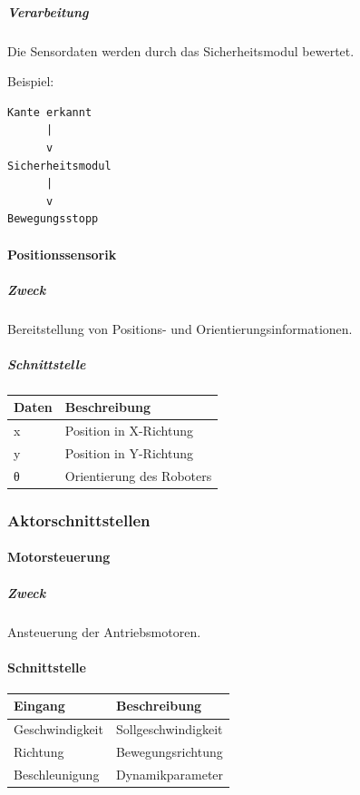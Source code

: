 \documentclass[
  a4paper,
  12pt,
  DIV=12,        %
  parskip=half,  %
  headings=small %
]{scrartcl}
\theoremstyle{definition}
\theoremstyle{definition}
\begin{document}
\subparagraph{Verarbeitung}\label{verarbeitung}

Die Sensordaten werden durch das Sicherheitsmodul bewertet.

Beispiel:

\begin{verbatim}
Kante erkannt
      |
      v
Sicherheitsmodul
      |
      v
Bewegungsstopp
\end{verbatim}

\paragraph{Positionssensorik}\label{positionssensorik-2}

\subparagraph{Zweck}\label{zweck-2}

Bereitstellung von Positions- und Orientierungsinformationen.

\subparagraph{Schnittstelle}\label{schnittstelle-2}

\begin{longtable}[]{@{}ll@{}}
\toprule\noalign{}
Daten & Beschreibung \\
\midrule\noalign{}
\endhead
\bottomrule\noalign{}
\endlastfoot
x & Position in X-Richtung \\
y & Position in Y-Richtung \\
θ & Orientierung des Roboters \\
\end{longtable}

\subsubsection{Aktorschnittstellen}\label{aktorschnittstellen}

\paragraph{Motorsteuerung}\label{motorsteuerung}

\subparagraph{Zweck}\label{zweck-3}

Ansteuerung der Antriebsmotoren.

\paragraph{Schnittstelle}\label{schnittstelle-3}

\begin{longtable}[]{@{}ll@{}}
\toprule\noalign{}
Eingang & Beschreibung \\
\midrule\noalign{}
\endhead
\bottomrule\noalign{}
\endlastfoot
Geschwindigkeit & Sollgeschwindigkeit \\
Richtung & Bewegungsrichtung \\
Beschleunigung & Dynamikparameter \\
\end{longtable}
\end{document}
